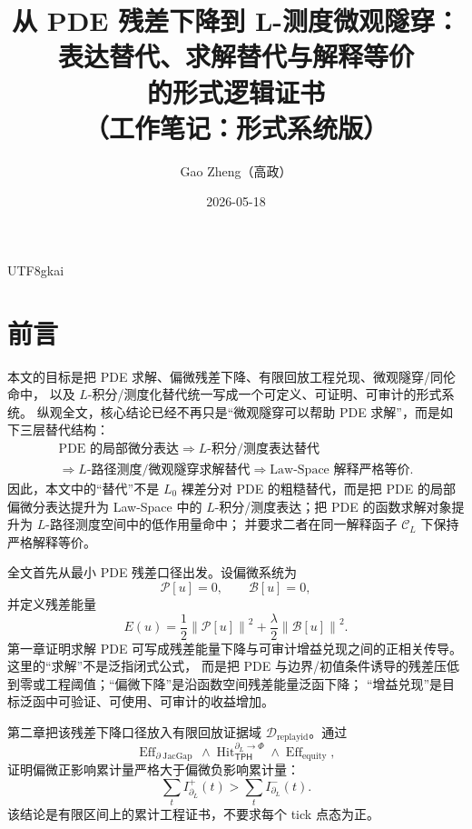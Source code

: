\documentclass[12pt]{article}
\newcommand{\Pcal}{\mathcal P}
\newcommand{\Bcal}{\mathcal B}
\newcommand{\TPH}{\ensuremath{\mathsf{TPH}}}
\newcommand{\norm}[1]{\left\lVert #1 \right\rVert}
\DeclareMathOperator{\Eff}{Eff}
\DeclareMathOperator{\Hit}{Hit}
\DeclareMathOperator{\JacGap}{JacGap}
\begin{document}
\begin{CJK*}{UTF8}{gkai}

\title{从 PDE 残差下降到 L-测度微观隧穿：\\表达替代、求解替代与解释等价\\的形式逻辑证书\\（工作笔记：形式系统版）}
\author{Gao Zheng（高政）}
\date{2026-05-18}
\maketitle

\section*{前言}

本文的目标是把 PDE 求解、偏微残差下降、有限回放工程兑现、微观隧穿/同伦命中，
以及 \(L\)-积分/测度化替代统一写成一个可定义、可证明、可审计的形式系统。
纵观全文，核心结论已经不再只是“微观隧穿可以帮助 PDE 求解”，而是如下三层替代结构：
\[
  \boxed{
  \begin{gathered}
  \text{PDE 的局部微分表达}
  \Rightarrow
  L\text{-积分/测度表达替代}\\
  \Rightarrow
  L\text{-路径测度/微观隧穿求解替代}
  \Rightarrow
  \text{Law-Space 解释严格等价}.
  \end{gathered}
  }
\]
因此，本文中的“替代”不是 \(L_0\) 裸差分对 PDE 的粗糙替代，而是把 PDE 的局部偏微分表达提升为
Law-Space 中的 \(L\)-积分/测度表达；把 PDE 的函数求解对象提升为 \(L\)-路径测度空间中的低作用量命中；
并要求二者在同一解释函子 \(\mathcal C_L\) 下保持严格解释等价。

全文首先从最小 PDE 残差口径出发。设偏微系统为
\[
  \Pcal[u]=0,
  \qquad
  \Bcal[u]=0,
\]
并定义残差能量
\[
  E(u)=\frac12\norm{\Pcal[u]}^2+\frac{\lambda}{2}\norm{\Bcal[u]}^2.
\]
第一章证明求解 PDE 可写成残差能量下降与可审计增益兑现之间的正相关传导。这里的“求解”不是泛指闭式公式，
而是把 PDE 与边界/初值条件诱导的残差压低到零或工程阈值；“偏微下降”是沿函数空间残差能量泛函下降；
“增益兑现”是目标泛函中可验证、可使用、可审计的收益增加。

第二章把该残差下降口径放入有限回放证据域 \(\mathcal D_{\mathrm{replayid}}\)。通过
\[
  \Eff_{\partial\JacGap}
  \wedge
  \Hit_{\TPH}^{\partial_L\to\Phi}
  \wedge
  \Eff_{\mathrm{equity}},
\]
证明偏微正影响累计量严格大于偏微负影响累计量：
\[
  \sum_t I^+_{\partial_L}(t)
  >
  \sum_t I^-_{\partial_L}(t).
\]
该结论是有限区间上的累计工程证书，不要求每个 tick 点态为正。


\end{CJK*}
\end{document}
